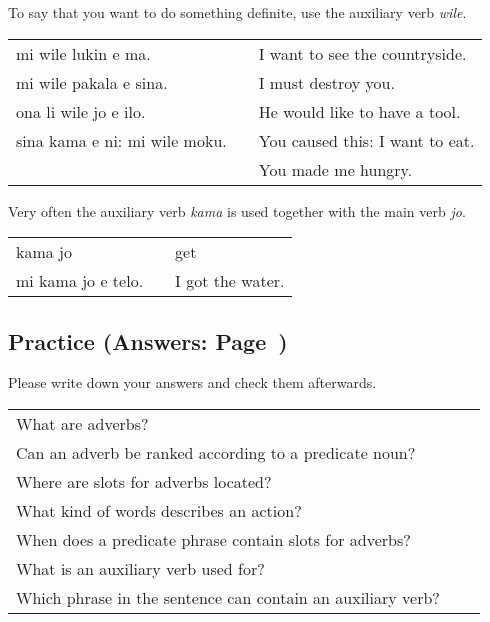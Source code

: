 To say that you want to do something definite, use the auxiliary verb \textit{wile}.

\begin{supertabular}{p{5,5cm}|ll}
    mi wile lukin e ma.           &  & I want to see the countryside.  \\
    mi wile pakala e sina.        &  & I must destroy you.             \\
    ona li wile jo e ilo.         &  & He would like to have a tool.   \\
    sina kama e ni: mi wile moku. &  & You caused this: I want to eat. \\ && You made me hungry. \\
\end{supertabular}

Very often the auxiliary verb \textit{kama} is used together with the main verb \textit{jo}.

\begin{supertabular}{p{5,5cm}|ll}
    kama jo            &  & get              \\
    mi kama jo e telo. &  & I got the water. \\
\end{supertabular}

\newpage
\subsection*{Practice (Answers: Page~\pageref{'adverbs'})}

Please write down your answers and check them afterwards.

\begin{supertabular}{p{5,5cm}|ll}
    What are adverbs?                                           &  & \\
    Can an adverb be ranked according to a predicate noun?      &  & \\
    Where are slots for adverbs located?                        &  & \\
    What kind of words describes an action?                     &  & \\
    When does a predicate phrase contain slots for adverbs?     &  & \\
    What is an auxiliary verb used for?                         &  & \\
    Which phrase in the sentence can contain an auxiliary verb? &  & \\
\end{supertabular}

